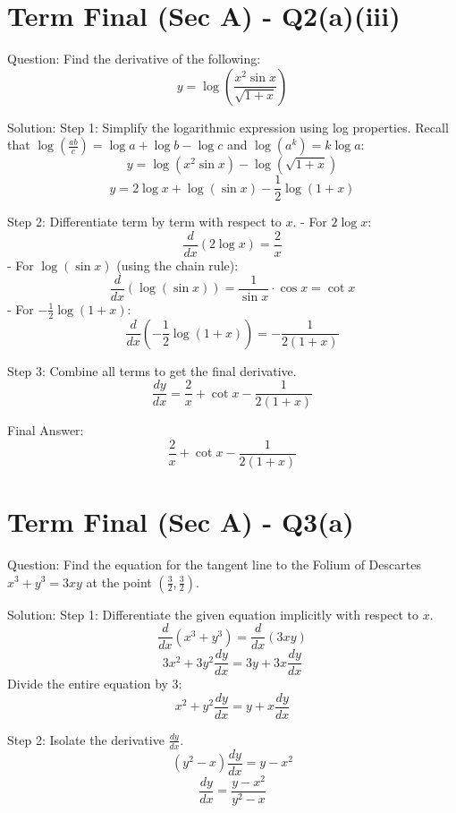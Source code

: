 \documentclass{article}
\begin{document}
\section*{Term Final (Sec A) - Q2(a)(iii)}
Question:
Find the derivative of the following:
\[
y = \log\left(\frac{x^2 \sin x}{\sqrt{1+x}}\right)
\]

Solution:
Step 1: Simplify the logarithmic expression using log properties.
Recall that $\log\left(\frac{ab}{c}\right) = \log a + \log b - \log c$ and $\log(a^k) = k \log a$:
\[
y = \log(x^2 \sin x) - \log(\sqrt{1+x})
\]
\[
y = 2\log x + \log(\sin x) - \frac{1}{2} \log(1+x)
\]

Step 2: Differentiate term by term with respect to $x$.
- For $2\log x$:
  \[
  \frac{d}{dx}(2\log x) = \frac{2}{x}
  \]
- For $\log(\sin x)$ (using the chain rule):
  \[
  \frac{d}{dx}(\log(\sin x)) = \frac{1}{\sin x} \cdot \cos x = \cot x
  \]
- For $-\frac{1}{2}\log(1+x)$:
  \[
  \frac{d}{dx}\left(-\frac{1}{2}\log(1+x)\right) = -\frac{1}{2(1+x)}
  \]

Step 3: Combine all terms to get the final derivative.
\[
\frac{dy}{dx} = \frac{2}{x} + \cot x - \frac{1}{2(1+x)}
\]

Final Answer:
\[
\boxed{\frac{2}{x} + \cot x - \frac{1}{2(1+x)}}
\]

\section*{Term Final (Sec A) - Q3(a)}
Question:
Find the equation for the tangent line to the Folium of Descartes $x^3 + y^3 = 3xy$ at the point $\left(\frac{3}{2}, \frac{3}{2}\right)$.

Solution:
Step 1: Differentiate the given equation implicitly with respect to $x$.
\[
\frac{d}{dx}(x^3 + y^3) = \frac{d}{dx}(3xy)
\]
\[
3x^2 + 3y^2 \frac{dy}{dx} = 3y + 3x \frac{dy}{dx}
\]
Divide the entire equation by 3:
\[
x^2 + y^2 \frac{dy}{dx} = y + x \frac{dy}{dx}
\]

Step 2: Isolate the derivative $\frac{dy}{dx}$.
\[
\left(y^2 - x\right) \frac{dy}{dx} = y - x^2
\]
\[
\frac{dy}{dx} = \frac{y - x^2}{y^2 - x}
\]
\end{document}
